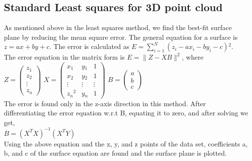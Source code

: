 \subsection{Standard Least squares for 3D point cloud}
  As mentioned above in the least squares method, we find the best-fit surface plane by reducing the mean square error. The general equation for a surface is $z = ax + by + c$. 
  The error is calculated as $E = \sum_{i=1}^{N} (z_i - ax{_i} - by_i - c){^2}$.\\
The error equation in the matrix form is $E = \| Z - XB \|^{2}$, where \vspace{3mm}  \\
  $Z =
  \begin{pmatrix}
    z_1 \\
    z_2 \\
    \vdots \\
    z_n
  \end{pmatrix}$ 
$ X =
  \begin{pmatrix}
    x{_1} & y{_1} & 1 \\
    x{_2} & y{_2} & 1 \\
    \vdots & \vdots & \vdots \\
    z{_n}{^2} & y{_n} & 1
  \end{pmatrix}$ 
$ B =
  \begin{pmatrix}
    a \\
    b \\
    c
  \end{pmatrix}$ \vspace{5mm} \\
The error is found only in the z-axis direction in this method.
After differentiating the error equation w.r.t B, equating it to zero, and after solving we get, \\
$B = (X^T X)^{-1} (X^T Y)$ \\
Using the above equation and the x, y, and z points of the data set, coefficients a, b, and c of the surface equation are found and the surface plane is plotted.
